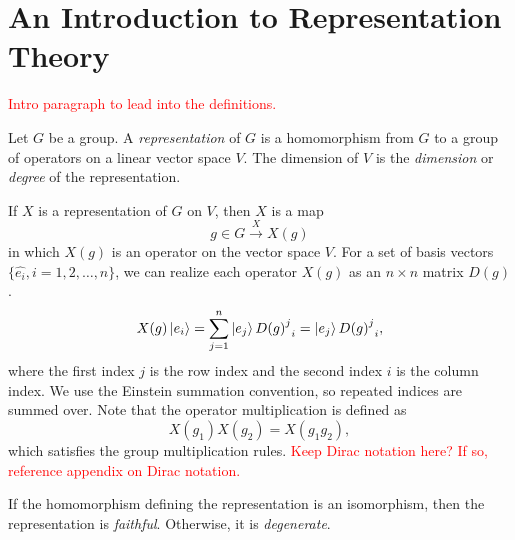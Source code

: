 \chapter{An Introduction to Representation Theory}\label{ch:rep_background}


\textcolor{red}{Intro paragraph to lead into the definitions.}

\begin{definition}
    Let $G$ be a group. A \textit{representation} of $G$ is a homomorphism from $G$ to a group of operators on a linear vector space $V$. The dimension of $V$ is the \textit{dimension} or \textit{degree} of the representation.
\end{definition}

If $X$ is a representation of $G$ on $V$, then $X$ is a map
\begin{equation}
    g\in G\xrightarrow{X} X(g)
\end{equation}
in which $X(g)$ is an operator on the vector space $V$. For a set of basis vectors $\{\hat{e_i},i=1,2,\dots,n\}$, we can realize each operator $X(g)$ as an $n\times n$ matrix $D(g)$.
\begin{equation}
    X(g)\ket{e_i} = \sum_{j=1}^n \ket{e_j}{{D(g)}^j}_i = \ket{e_j}{{D(g)}^j}_i,
\end{equation}
where the first index $j$ is the row index and the second index $i$ is the column index. We use the Einstein summation convention, so repeated indices are summed over. Note that the operator multiplication is defined as
\begin{equation}
    X(g_1)X(g_2) = X(g_1g_2),
\end{equation}
which satisfies the group multiplication rules. \textcolor{red}{Keep Dirac notation here? If so, reference appendix on Dirac notation.}

\begin{definition}
    If the homomorphism defining the representation is an isomorphism, then the representation is \textit{faithful}. Otherwise, it is \textit{degenerate}.
\end{definition}

